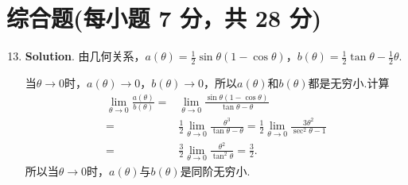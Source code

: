 \documentclass[../main.tex]{subfiles}
\begin{document}
\section{综合题(每小题 7 分，共 28 分)}
\begin{enumerate}
    \setcounter{enumi}{12}
    \item \textbf{Solution}. 由几何关系，$a(\theta)=\frac{1}{2}\sin\theta(1-
              \cos\theta)$，$b(\theta)=\frac{1}{2}\tan\theta-\frac{1}{2}\theta$.

          当$\theta\to0$时，$a(\theta)\to0$，$b(\theta)\to0$，所以$a(\theta)$和$b(\theta
              )$都是无穷小.计算
          \[
              \begin{aligned}
                  \lim_{\theta\to0}\frac{a(\theta)}{b(\theta)}= {} & \lim_{\theta\to0}\frac{\sin\theta(1-\cos\theta)}{\tan\theta-\theta}                                                         \\
                  = {}                                             & \frac{1}{2}\lim_{\theta\to0}\frac{\theta^3}{\tan\theta-\theta}=\frac{1}{2}\lim_{\theta\to0}\frac{3\theta^2}{\sec^2\theta-1} \\
                  = {}                                             & \frac{3}{2}\lim_{\theta\to0}\frac{\theta^2}{\tan^2\theta}=\frac{3}{2}.
              \end{aligned}
          \]
          所以当$\theta\to0$时，$a(\theta)$与$b(\theta)$是同阶无穷小.


\end{enumerate}
\end{document}
